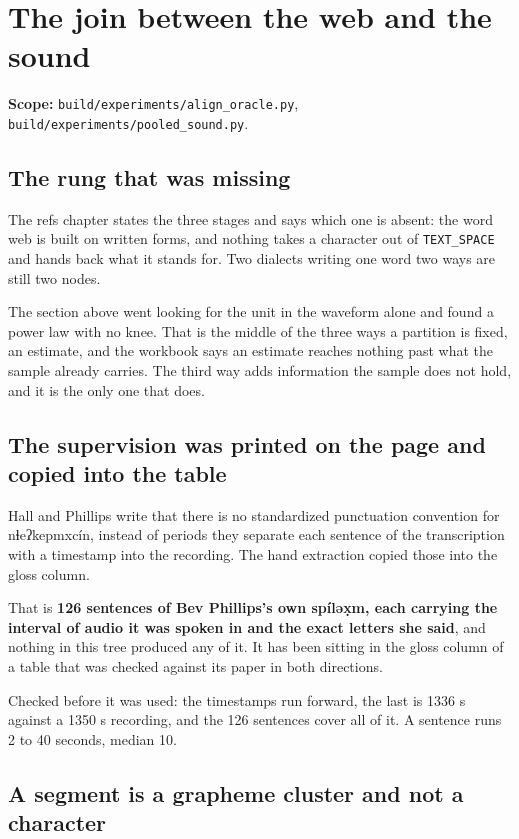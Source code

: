 \section{The join between the web and the sound}

\textbf{Scope:} \texttt{build/\allowbreak{}experiments/\allowbreak{}align\_\allowbreak{}oracle.\allowbreak{}py},
\texttt{build/\allowbreak{}experiments/\allowbreak{}pooled\_\allowbreak{}sound.\allowbreak{}py}.

\subsection{The rung that was missing}

The refs chapter states the three stages and says which one is absent: the word web is built on written
forms, and nothing takes a character out of \texttt{TEXT\_\allowbreak{}SPACE} and hands back what it
stands for. Two dialects writing one word two ways are still two nodes.

The section above went looking for the unit in the waveform alone and found a power law with no knee.
That is the middle of the three ways a partition is fixed, an estimate, and the workbook says an
estimate reaches nothing past what the sample already carries. The third way adds information the
sample does not hold, and it is the only one that does.

\subsection{The supervision was printed on the page and copied into the table}

Hall and Phillips write that there is no standardized punctuation convention for nɬeʔkepmxcín,
instead of periods they separate each sentence of the transcription with a timestamp into the
recording. The hand extraction copied those into the gloss column.

That is \textbf{126 sentences of Bev Phillips's own spíləx̣m, each carrying the interval of audio it
was spoken in and the exact letters she said}, and nothing in this tree produced any of it. It has
been sitting in the gloss column of a table that was checked against its paper in both directions.

Checked before it was used: the timestamps run forward, the last is 1336 s against a 1350 s
recording, and the 126 sentences cover all of it. A sentence runs 2 to 40 seconds, median 10.

\subsection{A segment is a grapheme cluster and not a character}

